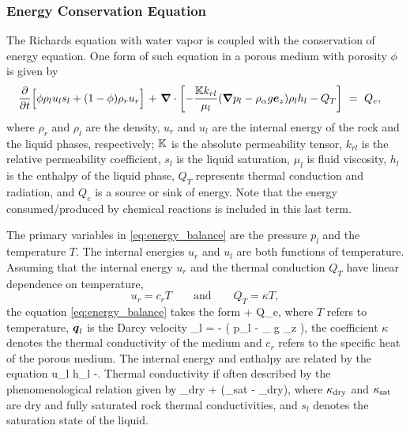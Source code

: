 \subsubsection{Energy Conservation Equation}
\label{sec:Energy}

The Richards equation with water vapor is coupled with the conservation of energy equation.
One form of such equation in a porous medium with porosity $\phi$ is given by
\begin{align}
\label{eq:energy_balance}
  \frac{\partial}{\partial t} \Big[ 
  \phi \rho_l u_l s_l
  + 
  (1-\phi )\rho_r u_r 
  \Big] \ 
  + \ &
  \boldsymbol{\nabla} \cdot \left[ 
  -\frac{\K k_{rl} }{\mu _l } (\boldsymbol{\nabla} p_l 
  -
  \rho _{\alpha} g \boldsymbol{e}_z)\rho _l h_l 
  - 
  Q_T 
  \right] 
  \eq 
  Q_e,
\end{align}
where
$\rho_{r}$ and $\rho_{l}$ are the density, 
$u_{r}$ and $u_l$ are the internal energy 
of the rock and the liquid phases, respectively;
${\mathbb K}$ is the absolute permeability tensor,
$k_{rl}$ is the relative permeability coefficient,
$s_l$ is the liquid saturation,
$\mu_l$ is fluid viscosity,
$h_l$ is the enthalpy of the liquid phase, 
$Q_T$ represents thermal conduction and radiation, and 
$Q_{e} $ is a source or sink of energy. 
Note that the energy consumed/produced by chemical reactions is included in this last term. 

The primary variables in \eqref{eq:energy_balance} are the pressure $p_l$ 
and the temperature $T$. 
The internal energies $u_r$ and $u_l$ are both functions of temperature.  
Assuming that the internal energy $u_r$ and the thermal conduction $Q_T$
have linear dependence on temperature,  
$$
  u_r = c_r T \qquad \text{and}\qquad Q_T=\kappa T,
$$
the equation \eqref{eq:energy_balance} takes the form 
\EQ
  + 
  \boldsymbol{\nabla}\cdot {} 
  \eq 
  Q_e,
\EN
where 
$T$ refers to temperature, 
${\boldsymbol{q}}_l$ is the Darcy velocity 
\EQ
  \bq_l 
  =  
  - 
  \left(
  \boldsymbol{\nabla} p_l 
  -
  \rho _{\alpha} g _z
  \right), 
\EN
the coefficient $\kappa$ denotes the thermal conductivity of the medium and 
$c_r$ refers to the specific heat of the porous medium. 
The internal energy and enthalpy are related by the equation
\EQ
  u_l \eq h_l -.
\EN
Thermal conductivity if often described by the phenomenological relation given by \citet{somerton1974high}
\EQ\label{cond} 
  \kappa \eq \kappa_{\rm dry} +  (\kappa_{\rm sat} - \kappa_{\rm dry}), 
\EN 
where $\kappa_{\rm dry}$ and $\kappa_{\rm sat}$ are dry and fully saturated rock thermal conductivities, 
and $s_l$ denotes the saturation state of the liquid. 

